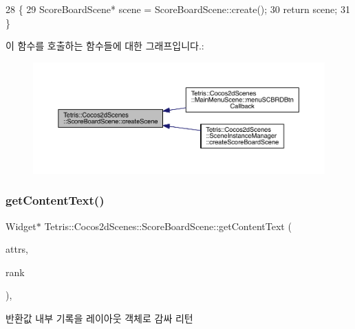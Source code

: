 \begin{DoxyCode}
28                                                   \{
29                     ScoreBoardScene* scene = ScoreBoardScene::create();
30                     \textcolor{keywordflow}{return} scene;
31                 \}
\end{DoxyCode}
이 함수를 호출하는 함수들에 대한 그래프입니다.\+:
\nopagebreak
\begin{figure}[H]
\begin{center}
\leavevmode
\includegraphics[width=350pt]{dc/dc7/class_tetris_1_1_cocos2d_scenes_1_1_score_board_scene_abedba06354b1f03d3f395e4c1841b8a6_icgraph}
\end{center}
\end{figure}
\mbox{\label{class_tetris_1_1_cocos2d_scenes_1_1_score_board_scene_a1fa0140e51fbae6cffb210487073b549}} 
\subsubsection{\texorpdfstring{get\+Content\+Text()}{getContentText()}}
{\footnotesize\ttfamily Widget$\ast$ Tetris\+::\+Cocos2d\+Scenes\+::\+Score\+Board\+Scene\+::get\+Content\+Text (\begin{DoxyParamCaption}\item[{struct \hyperlink{struct_tetris_1_1_d_b_management_1_1_score_board_attributes}{Score\+Board\+Attributes} $\ast$}]{attrs,  }\item[{int}]{rank }\end{DoxyParamCaption})\hspace{0.3cm}{\ttfamily [inline]}, {\ttfamily [protected]}}

\begin{DoxyReturn}{반환값}
내부 기록을 레이아웃 객체로 감싸 리턴 
\end{DoxyReturn}


